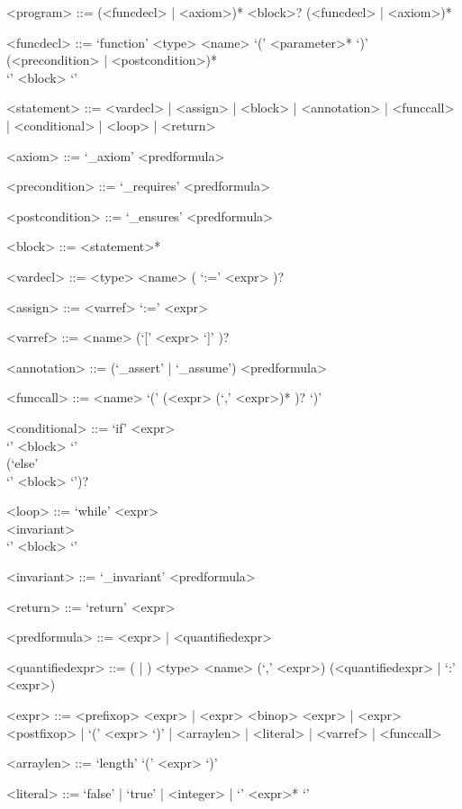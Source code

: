 \setlength{\grammarindent}{12em} %

\begin{grammar}

<program> ::= (<funcdecl> | <axiom>)* <block>? (<funcdecl> | <axiom>)*

<funcdecl> ::= `function' <type> <name> `(' <parameter>* `)' \\ (<precondition> | <postcondition>)* \\ `{' <block> `}'

<statement> ::= <vardecl> | <assign> | <block> | <annotation> | <funccall> | <conditional> | <loop> | <return>

<axiom> ::= `_axiom' <predformula>

<precondition> ::= `_requires' <predformula>

<postcondition> ::= `_ensures' <predformula>

<block> ::= <statement>*

<vardecl> ::= <type> <name> ( `:=' <expr> )?

<assign> ::= <varref> `:=' <expr>

<varref> ::= <name> (`[' <expr> `]' )?

<annotation> ::= (`_assert' | `_assume') <predformula>

<funccall> ::= <name> `(' (<expr> (`,' <expr>)* )? `)'

<conditional> ::= `if' <expr> \\ `{' <block> `}'  \\ (`else' \\ `{' <block> `}')?

<loop> ::= `while' <expr> \\ <invariant> \\ `{' <block> `}'

<invariant> ::= `_invariant' <predformula>

<return> ::= `return' <expr>

<predformula> ::= <expr> | <quantifiedexpr>

<quantifiedexpr> ::= (\lit{$\forall$} | \lit{$\exists$} ) <type> <name> (`,' <expr>) (<quantifiedexpr> | `:' <expr>)

<expr> ::= <prefixop> <expr> | <expr> <binop> <expr> | <expr> <postfixop> | `(' <expr> `)' | <arraylen> | <literal> | <varref> | <funccall>

<arraylen> ::= `length' `(' <expr> `)'

<literal> ::= `false' | `true' | <integer> | `{' <expr>* `}'


\end{grammar}

